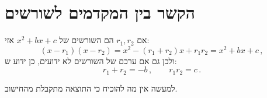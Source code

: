 
\section{הקשר בין המקדמים לשורשים}\label{s.computing}


\begin{theorem}\label{thm.roots-coefficients}
אם
$r_1,r_2$
הם השורשים של
$x^2+bx+c$
אזי:
\[
(x-r_1)(x-r_2)=x^2 - (r_1+r_2)x + r_1r_2=x^2+bx+c\,,
\]
ולכן גם אם ערכם של השורשים לא ידועים, כן ידוע ש:
\begin{equation}\label{eq.viete-quad}
r_1+r_2 = -b\,,\quad\quad r_1r_2=c\,.
\end{equation}
\end{theorem}
למעשה אין מה להוכיח כי התוצאה מתקבלת מהחישוב.

